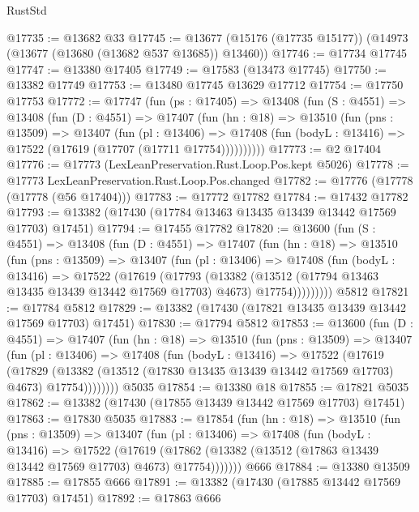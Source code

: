 \begin{lexlean}{RustStd}
\begin{coremodule}
@17735 := @13682 @33
@17745 := @13677 (@15176 (@17735 @15177)) (@14973 (@13677 (@13680 (@13682 @537 @13685)) @13460))
@17746 := @17734 @17745
@17747 := @13380 @17405
@17749 := @17583 (@13473 @17745)
@17750 := @13382 @17749
@17753 := @13480 @17745 @13629 @17712
@17754 := @17750 @17753
@17772 := @17747
    (fun (ps : @17405) =>
    @13408
      (fun (S : @4551) =>
      @13408
        (fun (D : @4551) =>
        @17407
          (fun (hn : @18) =>
          @13510
            (fun (pns : @13509) =>
            @13407
              (fun (pl : @13406) =>
              @17408 (fun (bodyL : @13416) => @17522 (@17619 (@17707 (@17711 @17754))))))))))
@17773 := @2 @17404
@17776 := @17773 (LexLeanPreservation.Rust.Loop.Pos.kept @5026)
@17778 := @17773 LexLeanPreservation.Rust.Loop.Pos.changed
@17782 := @17776 (@17778 (@17778 (@56 @17404)))
@17783 := @17772 @17782
@17784 := @17432 @17782
@17793 := @13382 (@17430 (@17784 @13463 @13435 @13439 @13442 @17569 @17703) @17451)
@17794 := @17455 @17782
@17820 := @13600
    (fun (S : @4551) =>
    @13408
      (fun (D : @4551) =>
      @17407
        (fun (hn : @18) =>
        @13510
          (fun (pns : @13509) =>
          @13407
            (fun (pl : @13406) =>
            @17408
              (fun (bodyL : @13416) =>
              @17522
                (@17619
                  (@17793
                    (@13382
                      (@13512 (@17794 @13463 @13435 @13439 @13442 @17569 @17703) @4673)
                      @17754)))))))))
    @5812
@17821 := @17784 @5812
@17829 := @13382 (@17430 (@17821 @13435 @13439 @13442 @17569 @17703) @17451)
@17830 := @17794 @5812
@17853 := @13600
    (fun (D : @4551) =>
    @17407
      (fun (hn : @18) =>
      @13510
        (fun (pns : @13509) =>
        @13407
          (fun (pl : @13406) =>
          @17408
            (fun (bodyL : @13416) =>
            @17522
              (@17619
                (@17829
                  (@13382 (@13512 (@17830 @13435 @13439 @13442 @17569 @17703) @4673) @17754))))))))
    @5035
@17854 := @13380 @18
@17855 := @17821 @5035
@17862 := @13382 (@17430 (@17855 @13439 @13442 @17569 @17703) @17451)
@17863 := @17830 @5035
@17883 := @17854
    (fun (hn : @18) =>
    @13510
      (fun (pns : @13509) =>
      @13407
        (fun (pl : @13406) =>
        @17408
          (fun (bodyL : @13416) =>
          @17522
            (@17619
              (@17862 (@13382 (@13512 (@17863 @13439 @13442 @17569 @17703) @4673) @17754)))))))
    @666
@17884 := @13380 @13509
@17885 := @17855 @666
@17891 := @13382 (@17430 (@17885 @13442 @17569 @17703) @17451)
@17892 := @17863 @666

\end{coremodule}
\end{lexlean}
